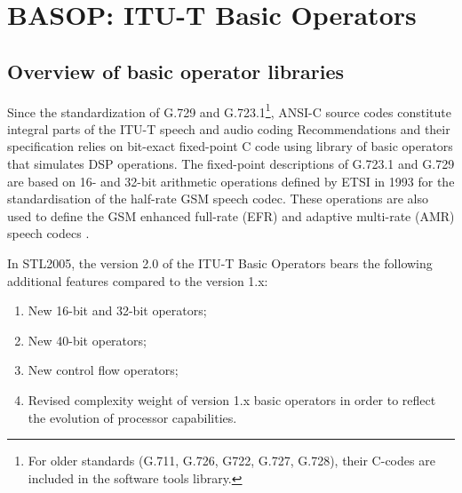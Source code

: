 \chapter{BASOP: ITU-T Basic Operators}

\def\newop20{\begin{math} \rightarrow \textsc{New in v2.0} \end{math}}

\section{Overview of basic operator libraries}

Since the standardization of G.729 and G.723.1\footnote{For older
  standards (G.711, G.726, G722, G.727, G.728), their C-codes are
  included in the software tools library.}, ANSI-C source codes
constitute integral parts of the ITU-T speech and audio coding
Recommendations and their specification relies on bit-exact
fixed-point C code using library of basic operators that simulates
DSP operations. The fixed-point descriptions of G.723.1 and G.729 are based on
16- and 32-bit arithmetic operations defined by ETSI in 1993 for the
standardisation of the half-rate GSM speech codec. These operations
are also used to define the GSM enhanced full-rate (EFR) and adaptive
multi-rate (AMR) speech codecs \cite{G.191}.

In STL2005, the version 2.0 of the ITU-T Basic Operators bears the following additional features compared to the version 1.x:
\begin{enumerate}
\item New 16-bit and 32-bit operators;
\item New 40-bit operators;
\item New control flow operators; 
\item Revised complexity weight of version 1.x basic operators in order to reflect the evolution of processor capabilities.
\end{enumerate}

